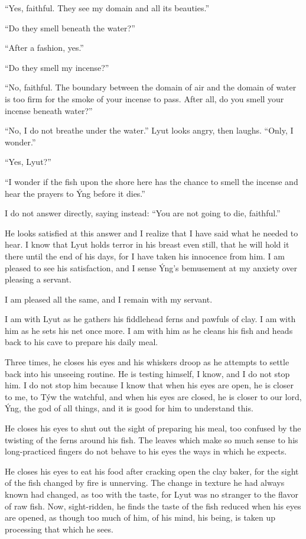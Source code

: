 ``Yes, faithful. They see my domain and all its beauties.''

``Do they smell beneath the water?''

``After a fashion, yes.''

``Do they smell my incense?''

``No, faithful. The boundary between the domain of air and the domain of water is too firm for the smoke of your incense to pass. After all, do you smell your incense beneath water?''

``No, I do not breathe under the water.'' Lyut looks angry, then laughs. ``Only, I wonder.''

``Yes, Lyut?''

``I wonder if the fish upon the shore here has the chance to smell the incense and hear the prayers to Ýng before it dies.''

I do not answer directly, saying instead: ``You are not going to die, faithful.''

He looks satisfied at this answer and I realize that I have said what he needed to hear. I know that Lyut holds terror in his breast even still, that he will hold it there until the end of his days, for I have taken his innocence from him. I am pleased to see his satisfaction, and I sense Ýng's bemusement at my anxiety over pleasing a servant.

I am pleased all the same, and I remain with my servant.

I am with Lyut as he gathers his fiddlehead ferns and pawfuls of clay. I am with him as he sets his net once more. I am with him as he cleans his fish and heads back to his cave to prepare his daily meal.

Three times, he closes his eyes and his whiskers droop as he attempts to settle back into his unseeing routine. He is testing himself, I know, and I do not stop him. I do not stop him because I know that when his eyes are open, he is closer to me, to Týw the watchful, and when his eyes are closed, he is closer to our lord, Ýng, the god of all things, and it is good for him to understand this.

He closes his eyes to shut out the sight of preparing his meal, too confused by the twisting of the ferns around his fish. The leaves which make so much sense to his long-practiced fingers do not behave to his eyes the ways in which he expects.

He closes his eyes to eat his food after cracking open the clay baker, for the sight of the fish changed by fire is unnerving. The change in texture he had always known had changed, as too with the taste, for Lyut was no stranger to the flavor of raw fish. Now, sight-ridden, he finds the taste of the fish reduced when his eyes are opened, as though too much of him, of his mind, his being, is taken up processing that which he sees.

